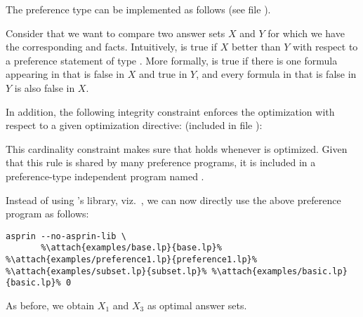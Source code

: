 \begin{example}\label{asprin:subset_imp}
The preference type  can be implemented as follows
(see file ).
%

%
Consider that we want to compare two answer sets $X$ and $Y$
for which we have the corresponding  and  facts. 
Intuitively,  is true if $X$ better than $Y$ with respect to a preference statement  
of type . 
More formally, 
 is true if there is one formula  appearing in  that is false in $X$ and true in $Y$, 
and every formula  in  that is false in $Y$ is also false in $X$.  

In addition, 
the following integrity constraint enforces the optimization with respect to a given optimization directive:
(included in file ):
%

%
This cardinality constraint makes sure that  holds whenever  is optimized. 
Given that this rule is shared by many preference programs, 
it is included in a preference-type independent program named .

Instead of using \asprin's library, viz.~, 
we can now directly use the above preference program as follows:
\begin{lstlisting}[numbers=none,escapechar=\%]
asprin --no-asprin-lib \
       %\attach{examples/base.lp}{base.lp}% %\attach{examples/preference1.lp}{preference1.lp}% %\attach{examples/subset.lp}{subset.lp}% %\attach{examples/basic.lp}{basic.lp}% 0
\end{lstlisting}
As before, we obtain $X_1$ and $X_3$ as optimal answer sets.
\end{example}

